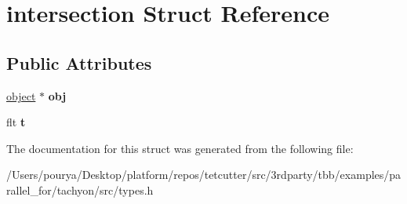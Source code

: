 \hypertarget{structintersection}{}\section{intersection Struct Reference}
\label{structintersection}
\subsection*{Public Attributes}
\begin{DoxyCompactItemize}
\item 
\hypertarget{structintersection_ad7b841ad1381c4ab0f64fe88dd8b1625}{}\hyperlink{structobject}{object} $\ast$ {\bfseries obj}\label{structintersection_ad7b841ad1381c4ab0f64fe88dd8b1625}

\item 
\hypertarget{structintersection_a24144b472815f7116b67491d38a0dfa1}{}flt {\bfseries t}\label{structintersection_a24144b472815f7116b67491d38a0dfa1}

\end{DoxyCompactItemize}


The documentation for this struct was generated from the following file\+:\begin{DoxyCompactItemize}
\item 
/\+Users/pourya/\+Desktop/platform/repos/tetcutter/src/3rdparty/tbb/examples/parallel\+\_\+for/tachyon/src/types.\+h\end{DoxyCompactItemize}
